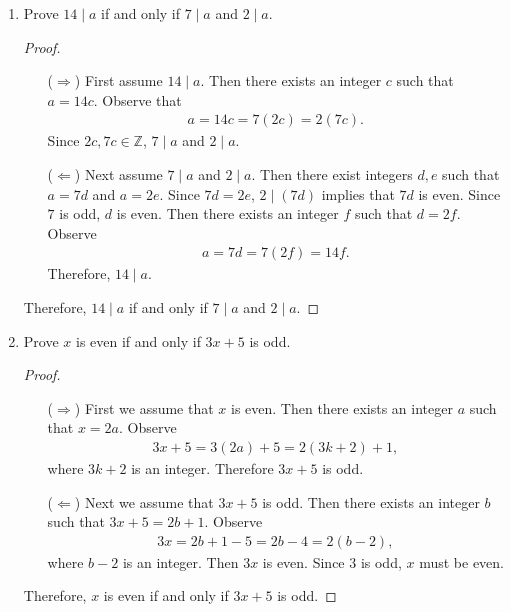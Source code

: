 \documentclass{article}
\theoremstyle{definition}
\begin{document}
    \begin{enumerate}
	\item Prove $14 \mid a$ if and only if $7 \mid a$ and $2\mid a$.
        \begin{proof}
            \begin{enumerate}
                \item[($\Rightarrow$)] First assume $14 \mid a$. Then there exists an integer $c$ such that $a=14c$. Observe that 
                \begin{align*}
                    a = 14c = 7(2c) = 2(7c).
                \end{align*}
                Since $2c, 7c \in \mathbb{Z}$, $7\mid a$ and $2\mid a$.
                \item[($\Leftarrow$)] Next assume $7\mid a$ and $2\mid a$. Then there exist integers $d,e$ such that $a=7d$ and $a=2e$. Since $7d=2e$, $2\mid (7d)$ implies that $7d$ is even. Since $7$ is odd, $d$ is even. Then there exists an integer $f$ such that $d=2f$. Observe 
                \begin{align*}
                    a = 7d = 7(2f) = 14f.
                \end{align*}
                Therefore, $14\mid a$.
            \end{enumerate}
            Therefore, $14 \mid a$ if and only if $7 \mid a$ and $2\mid a$.
        \end{proof}
	\item Prove $x$ is even if and only if $3x+5$ is odd.
        \begin{proof}
            \begin{enumerate}
                \item[($\Rightarrow$)] First we assume that $x$ is even. Then there exists an integer $a$ such that $x=2a$. Observe
                \begin{align*}
                    3x+5 = 3(2a)+5 = 2(3k+2)+1, 
                \end{align*}
                where $3k+2$ is an integer. Therefore $3x+5$ is odd.
                \item[($\Leftarrow$)] Next we assume that $3x+5$ is odd. Then there exists an integer $b$ such that $3x+5 = 2b+1$. Observe 
                \begin{align*}
                    3x = 2b+1 - 5 = 2b-4 = 2(b-2), 
                \end{align*}
                where $b-2$ is an integer. Then $3x$ is even. Since $3$ is odd, $x$ must be even.
            \end{enumerate}
            Therefore, $x$ is even if and only if $3x+5$ is odd.
        \end{proof}
    \end{enumerate}
\end{document}
